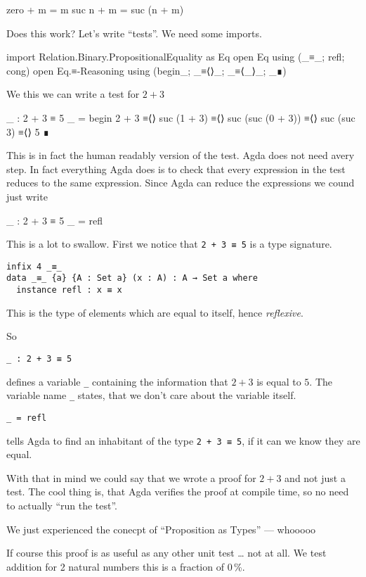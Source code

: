 \begin{code}
zero + m = m
suc n + m = suc (n + m)
\end{code}

Does this work? Let's write “tests”. We need some imports.
\begin{code}
import Relation.Binary.PropositionalEquality as Eq
open Eq using (_≡_; refl; cong)
open Eq.≡-Reasoning using (begin_; _≡⟨⟩_; _≡⟨_⟩_; _∎)
\end{code}

We this we can write a test for $2 + 3$
\begin{code}
_ : 2 + 3 ≡ 5
_ =
  begin
    2 + 3
  ≡⟨⟩
    suc (1 + 3)
  ≡⟨⟩
    suc (suc (0 + 3))
  ≡⟨⟩
    suc (suc 3)
  ≡⟨⟩
    5
  ∎
\end{code}
This is in fact the human readably version of the test. Agda does not need
avery step. In fact everything Agda does is to check that every expression
in the test reduces to the same expression. Since Agda can reduce the expressions
we cound just write
\begin{code}
_ : 2 + 3 ≡ 5
_ = refl
\end{code}

This is a lot to swallow. First we notice that \verb=2 + 3 ≡ 5= is a type signature.

\begin{verbatim}
infix 4 _≡_
data _≡_ {a} {A : Set a} (x : A) : A → Set a where
  instance refl : x ≡ x
\end{verbatim}
This is the type of elements which are equal to itself, hence \emph{reflexive}.

So
\begin{verbatim}
_ : 2 + 3 ≡ 5
\end{verbatim}
defines a variable \verb+_+ containing the information that $2+3$ is equal to $5$.
The variable name \verb+_+ states, that we don't care about the variable itself.

\begin{verbatim}
_ = refl
\end{verbatim}
tells Agda to find an inhabitant of the type \verb=2 + 3 ≡ 5=, if it can
we know they are equal.

With that in mind we could say that we wrote a proof for $2+3$ and not just a test.
The cool thing is, that Agda verifies the proof at compile time, so no need to
actually “run the test”.

We just experienced the conecpt of “Proposition as Types” — whooooo

If course this proof is as useful as any other unit test … not at all.
We test addition for 2 natural numbers this is a fraction of 0\,\%.

